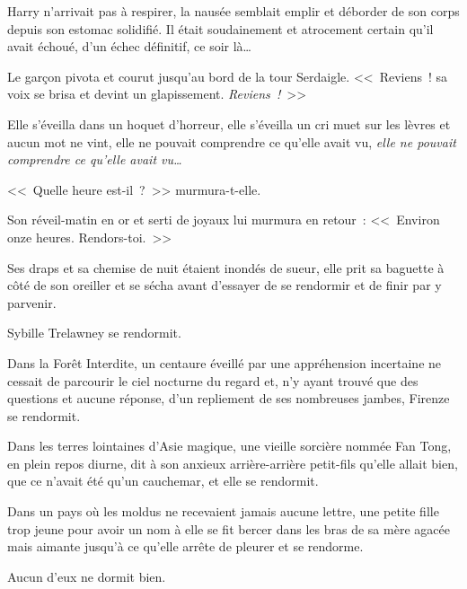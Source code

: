 Harry n'arrivait pas à respirer, la nausée semblait emplir et déborder de son corps depuis son estomac solidifié. Il était soudainement et atrocement certain qu'il avait échoué, d'un échec définitif, ce soir là…

Le garçon pivota et courut jusqu'au bord de la tour Serdaigle. <<~Reviens~! sa voix se brisa et devint un glapissement. \emph{Reviens~!}~>>


Elle s'éveilla dans un hoquet d'horreur, elle s'éveilla un cri muet sur les lèvres et aucun mot ne vint, elle ne pouvait comprendre ce qu'elle avait vu, \emph{elle ne pouvait comprendre ce qu'elle avait vu…}

<<~Quelle heure est-il~?~>> murmura-t-elle.

Son réveil-matin en or et serti de joyaux lui murmura en retour~: <<~Environ onze heures. Rendors-toi.~>>

Ses draps et sa chemise de nuit étaient inondés de sueur, elle prit sa baguette à côté de son oreiller et se sécha avant d'essayer de se rendormir et de finir par y parvenir.

Sybille Trelawney se rendormit.

Dans la Forêt Interdite, un centaure éveillé par une appréhension incertaine ne cessait de parcourir le ciel nocturne du regard et, n'y ayant trouvé que des questions et aucune réponse, d'un repliement de ses nombreuses jambes, Firenze se rendormit.

Dans les terres lointaines d'Asie magique, une vieille sorcière nommée Fan Tong, en plein repos diurne, dit à son anxieux arrière-arrière petit-fils qu'elle allait bien, que ce n'avait été qu'un cauchemar, et elle se rendormit.

Dans un pays où les moldus ne recevaient jamais aucune lettre, une petite fille trop jeune pour avoir un nom à elle se fit bercer dans les bras de sa mère agacée mais aimante jusqu'à ce qu'elle arrête de pleurer et se rendorme.

Aucun d'eux ne dormit bien.
